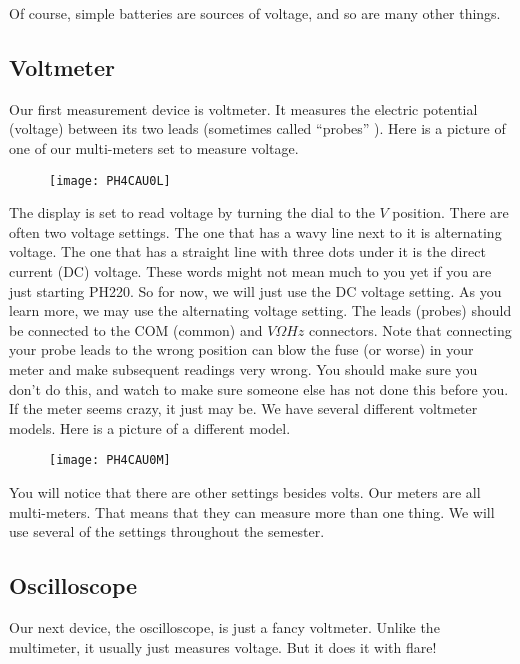 Of course, simple batteries are sources of voltage, and so are many other things.

\subsection{Voltmeter}

Our first measurement device is voltmeter. It measures the electric potential (voltage) between its two leads (sometimes called ``probes'' ). Here is a picture of one of our multi-meters set to measure voltage.

\begin{figure}[h!]
	\centering
	\texttt{[image: PH4CAU0L]}
\end{figure}

The display is set to read voltage by turning the dial to the $\unit{V}$ position. There are often two voltage settings. The one that has a wavy line next to it is alternating voltage. The one that has a straight line with three dots under it is the direct current (DC) voltage. These words might not mean much to you yet if you are just starting PH220. So for now, we will just use the DC voltage setting. As you learn more, we may use the alternating voltage setting. The leads (probes) should be connected to the COM (common) and $\unit{V}\unit{\Omega}\unit{Hz}$ connectors. Note that connecting your probe leads to the wrong position can blow the fuse (or worse) in your meter and make subsequent readings very wrong. You should make sure you don't do this, and watch to make sure someone else has not done this before you. If the meter seems crazy, it just may be. We have several different voltmeter models. Here is a picture of a different model.

\begin{figure}[h!]
   \centering
   \texttt{[image: PH4CAU0M]}
\end{figure}

You will notice that there are other settings besides volts. Our meters are all multi-meters. That means that they can measure more than one thing. We will use several of the settings throughout the semester.

\subsection{Oscilloscope}

Our next device, the oscilloscope, is just a fancy voltmeter. Unlike the multimeter, it usually just measures voltage. But it does it with flare!

